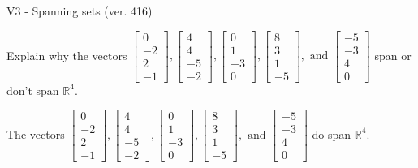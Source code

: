 \begin{exercise}
  \begin{exerciseTitle}V3 - Spanning sets (ver. 416)\end{exerciseTitle}
  \begin{exerciseStatement}
    Explain why the vectors \(\left[\begin{array}{r}
0 \\
-2 \\
2 \\
-1
\end{array}\right] , \left[\begin{array}{r}
4 \\
4 \\
-5 \\
-2
\end{array}\right] , \left[\begin{array}{r}
0 \\
1 \\
-3 \\
0
\end{array}\right] , \left[\begin{array}{r}
8 \\
3 \\
1 \\
-5
\end{array}\right] , \text{ and } \left[\begin{array}{r}
-5 \\
-3 \\
4 \\
0
\end{array}\right]\) span or don't span \(\mathbb{R}^4\). 
	


  \end{exerciseStatement}
  \begin{exerciseAnswer}
   The vectors \(\left[\begin{array}{r}
0 \\
-2 \\
2 \\
-1
\end{array}\right] , \left[\begin{array}{r}
4 \\
4 \\
-5 \\
-2
\end{array}\right] , \left[\begin{array}{r}
0 \\
1 \\
-3 \\
0
\end{array}\right] , \left[\begin{array}{r}
8 \\
3 \\
1 \\
-5
\end{array}\right] , \text{ and } \left[\begin{array}{r}
-5 \\
-3 \\
4 \\
0
\end{array}\right]\) 
  	 do  
	span \(\mathbb{R}^4\).
  



\end{exerciseAnswer}
\end{exercise}
